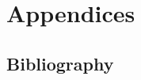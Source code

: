 \documentclass[twoside,openright,titlepage,
headinclude,footinclude,cleardoublepage=empty,
numbers=noenddot,fontsize=9pt]{scrbook}
\begin{document}


\appendix
\cleardoublepage
\part{Appendices}



%

\backmatter
\chapter*{Bibliography}
\begingroup
\renewcommand{\chapter}[2]{} %

{}
\endgroup




\cleardoublepage

\end{document}
